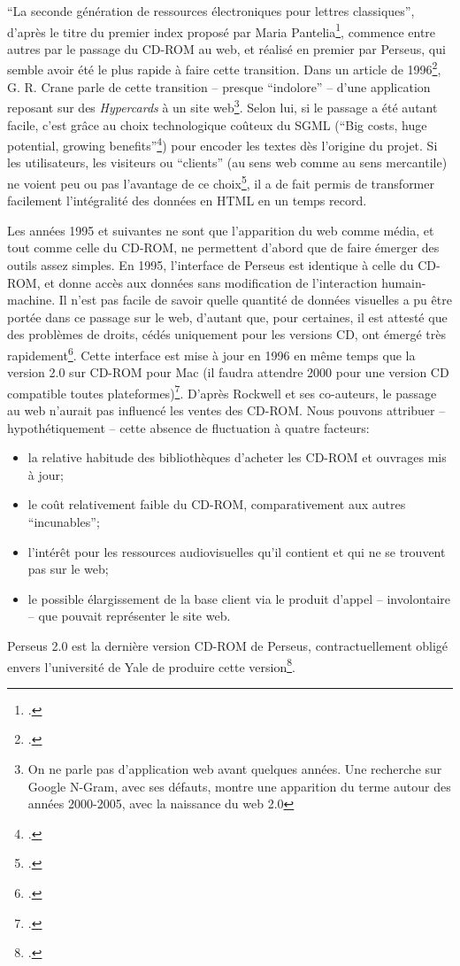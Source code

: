 \enquote{La seconde génération de ressources électroniques pour lettres classiques}, d'après le titre du premier index proposé par Maria Pantelia\footcite{pantelia_electronic_1994}, commence entre autres par le passage du CD-ROM au web, et réalisé en premier par Perseus, qui semble avoir été le plus rapide à faire cette transition. Dans un article de 1996\footcite{crane_building_1996}, G. R. Crane parle de cette transition -- presque \enquote{indolore} -- d'une application reposant sur des \textit{Hypercards} à un site web\footnote{On ne parle pas d'application web avant quelques années. Une recherche sur Google N-Gram, avec ses défauts, montre une apparition du terme autour des années 2000-2005, avec la naissance du web 2.0}. Selon lui, si le passage a été autant facile, c'est grâce au choix technologique coûteux du SGML (\enquote{Big costs, huge potential, growing benefits}\footcite[p. 7]{crane_building_1996}) pour encoder les textes dès l'origine du projet. Si les utilisateurs, les visiteurs ou \enquote{clients} (au sens web comme au sens mercantile) ne voient peu ou pas l'avantage de ce choix\footcite[p. 8]{crane_building_1996}, il a de fait permis de transformer facilement l'intégralité des données en HTML en un temps record.

Les années 1995 et suivantes ne sont que l'apparition du web comme média, et tout comme celle du CD-ROM, ne permettent d'abord que de faire émerger des outils assez simples. En 1995, l'interface de Perseus est identique à celle du CD-ROM, et donne accès aux données sans modification de l'interaction humain-machine. Il n'est pas facile de savoir quelle quantité de données visuelles a pu être portée dans ce passage sur le web, d'autant que, pour certaines, il est attesté que des problèmes de droits, cédés uniquement pour les versions CD, ont émergé très rapidement\footcite[p.~3]{crane_building_1996}. Cette interface est mise à jour en 1996 en même temps que la version 2.0 sur CD-ROM pour Mac (il faudra attendre 2000 pour une version CD compatible toutes plateformes)\footcite[p.~109]{rockwell_interface_2020}. D'après Rockwell et ses co-auteurs, le passage au web n'aurait pas influencé les ventes des CD-ROM. Nous pouvons attribuer -- hypothétiquement -- cette absence de fluctuation à quatre facteurs:
\begin{itemize}
    \item la relative habitude des bibliothèques d'acheter les CD-ROM et ouvrages mis à jour;
    \item le coût relativement faible du CD-ROM, comparativement aux autres \enquote{incunables};
    \item l'intérêt pour les ressources audiovisuelles qu'il contient et qui ne se trouvent pas sur le web;
    \item le possible élargissement de la base client via le produit d'appel -- involontaire -- que pouvait représenter le site web.
\end{itemize}
Perseus 2.0 est la dernière version CD-ROM de Perseus, contractuellement obligé envers l'université de Yale de produire cette version\footcite[p.~3]{crane_building_1996}. 

